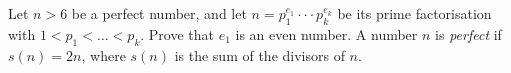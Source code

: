 Let \(n>6\) be a perfect number, and let \(n=p_1^{e_1}\cdot\cdot\cdot p_k^{e_k}\) be its prime factorisation with \(1<p_1<\dots <p_k\). Prove that \(e_1\) is an even number.
A number \(n\) is \textit{perfect} if \(s(n)=2n\), where \(s(n)\) is the sum of the divisors of \(n\).